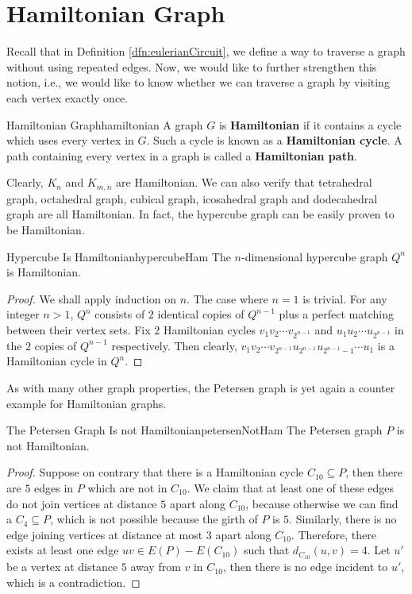 \documentclass[math, code]{amznotes}
\theoremstyle{remark}
\begin{document}
\section{Hamiltonian Graph}
Recall that in Definition \ref{dfn:eulerianCircuit}, we define a way to traverse a graph without using repeated edges. Now, we would like to further strengthen this notion, i.e., we would like to know whether we can traverse a graph by visiting each vertex exactly once.
\begin{dfnbox}{Hamiltonian Graph}{hamiltonian}
    A graph $G$ is {\color{red} \textbf{Hamiltonian}} if it contains a cycle which uses every vertex in $G$. Such a cycle is known as a {\color{red} \textbf{Hamiltonian cycle}}. A path containing every vertex in a graph is called a {\color{red} \textbf{Hamiltonian path}}.
\end{dfnbox}
Clearly, $K_n$ and $K_{m, n}$ are Hamiltonian. We can also verify that tetrahedral graph, octahedral graph, cubical graph, icosahedral graph and dodecahedral graph are all Hamiltonian. In fact, the hypercube graph can be easily proven to be Hamiltonian.
\begin{probox}{Hypercube Is Hamiltonian}{hypercubeHam}
    The $n$-dimensional hypercube graph $Q^n$ is Hamiltonian.
    \tcblower
    \begin{proof}
        We shall apply induction on $n$. The case where $n = 1$ is trivial. For any integer $n > 1$, $Q^n$ consists of $2$ identical copies of $Q^{n - 1}
        $ plus a perfect matching between their vertex sets. Fix $2$ Hamiltonian cycles $v_1v_2\cdots v_{2^{n - 1}}$ and $u_1u_2\cdots u_{2^{n - 1}}$ in the $2$ copies of $Q^{n - 1}$ respectively. Then clearly, $v_1v_2\cdots v_{2^{n - 1}}u_{2^{n - 1}}u_{2^{n - 1} - 1}\cdots u_1$ is a Hamiltonian cycle in $Q^n$.
    \end{proof}
\end{probox}
As with many other graph properties, the Petersen graph is yet again a counter example for Hamiltonian graphs.
\begin{probox}{The Petersen Graph Is not Hamiltonian}{petersenNotHam}
    The Petersen graph $P$ is not Hamiltonian.
    \tcblower
    \begin{proof}
        Suppose on contrary that there is a Hamiltonian cycle $C_{10} \subseteq P$, then there are $5$ edges in $P$ which are not in $C_{10}$. We claim that at least one of these edges do not join vertices at distance $5$ apart along $C_{10}$, because otherwise we can find a $C_4 \subseteq P$, which is not possible because the girth of $P$ is $5$. Similarly, there is no edge joining vertices at distance at most $3$ apart along $C_{10}$. Therefore, there exists at least one edge $uv \in E(P) - E(C_{10})$ such that $d_{C_{10}}(u, v) = 4$. Let $u'$ be a vertex at distance $5$ away from $v$ in $C_{10}$, then there is no edge incident to $u'$, which is a contradiction.
    \end{proof}
\end{probox}
\end{document}
